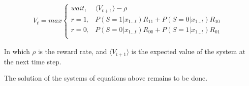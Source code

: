 \documentclass[12pt]{article}
\begin{document}
\begin{align}
V_t = max
\begin{cases}
wait, & \langle V_{t+1} \rangle -\rho\\
r=1, & P(S=1 | x_{1 \dots t})R_{11} + P(S=0|x_{1 \dots t})R_{10}\\
r=0, & P(S=0 | x_{1 \dots t})R_{00} + P(S=1 | x_{1 \dots t})R_{01}\\
\end{cases}
\end{align}

In which $\rho$ is the reward rate, and $\langle V_{t+1} \rangle$ is the expected value of the system at the next time step.

The solution of the systems of equations above remains to be done.
\end{document}

